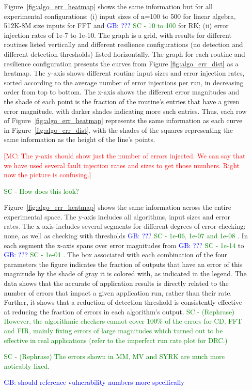 \documentclass{sig-alternate}
\newcommand{\sui}[1]{%
  \textcolor{green}{SC - #1}
}
\newcommand{\marc}[1]{%
  \textcolor{red}{[MC: #1]}
}
\newcommand{\greg}[1]{%
  \textcolor{blue}{GB: #1}
}
\begin{document}
Figure~\ref{fig:algo_err_heatmap} shows the same information but for all experimental configurations: (i) input sizes of n=100 to 500 for linear algebra, 512K-8M size inputs for FFT and \greg{???} \sui{10 to 100} for RK; (ii) error injection rates of 1e-7 to 1e-10.
The graph is a grid, with results for different routines listed vertically and different resilience configurations (no detection and different detection thresholds) listed horizontally.
The graph for each routine and resilience configuration presents the curves from Figure \ref{fig:algo_err_dist} as a heatmap.
The y-axis shows different routine input sizes and error injection rates, sorted according to the average number of error injections per run, in decreasing order from top to bottom.
The x-axis shows the different error magnitudes and the shade of each point is the fraction of the routine's entries that have a given error magnitude, with darker shades indicating more such entries.
Thus, each row of Figure~\ref{fig:algo_err_heatmap} represents the same information as each curve in Figure~\ref{fig:algo_err_dist}, with the shades of the squares representing the same information as the height of the line's points.

\marc{The y-axis should show just the number of errors injected. We can say that we have used several fault injection rates and sizes to get those numbers. Right now the picture is confusing.}
\sui{How does this look?}

Figure~\ref{fig:algo_err_heatmap} shows the same information across the entire experimental space.
The y-axis includes all algorithms, input sizes and error rates.
The x-axis includes several segments for different degrees of error checking: none, as well as checking with thresholds \greg{???} \sui{1e-06, 1e-07 and 1e-08}. In each segment the x-axis spans over error magnitudes from \greg{???} \sui{1e-14} to \greg{???} \sui{1e-01}.
The box associated with each combination of the four parameters the figure indicates the fraction of outputs that have an error of this magnitude by the shade of gray it is colored with, as indicated in the legend.
The data shows that the accurate of application results is directly related to the number of errors that impact a given application run, rather than their rate.
Further, it shows that a reduction of detection threshold is consistently effective at reducing the fraction of errors in each algorithm's output.
\sui{(Rephrase) However, the algorithmic checkers cannot cover 100\% of the errors for CD, FFT and FIR, mainly fixing errors of large magnitudes which turned out to be effective in real applications (refer to the imperfect run rate plot for DRC.)}
\sui{(Rephrase) The errors shown in MM, MV and SYRK are much more noticably fixed.}
\greg{should reference vulnerability numbers more specifically}
\end{document}
